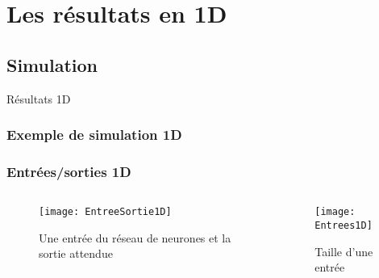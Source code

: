 

% 

\section{Les résultats en 1D}

\subsection{Simulation}
\begin{frame}
    \large
    \centering
    Résultats 1D
\end{frame}

\begin{frame}[fragile]
    \frametitle{Exemple de simulation 1D}
  \begin{center}
  \end{center}
\end{frame}

\begin{frame}[fragile]
    \frametitle{Entrées/sorties 1D}

    \begin{columns}
    \begin{column}{0.7\textwidth}
        \begin{figure}
        \texttt{[image: EntreeSortie1D]}       
        \caption{Une entrée du réseau de neurones et la sortie attendue}
        \end{figure}
     \end{column}
     \begin{column}{0.3\textwidth}
        \begin{figure}
        \texttt{[image: Entrees1D]}       
        \caption{Taille d'une entrée}
        \end{figure}
     \end{column}
    \end{columns}

\end{frame}

